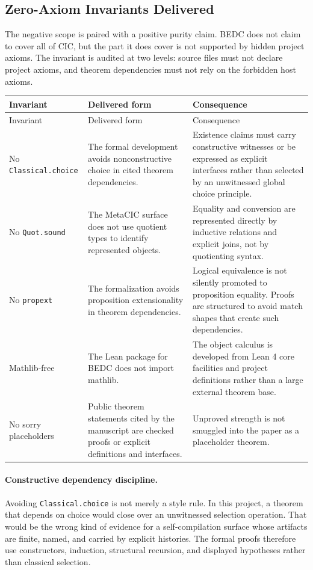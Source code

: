 \subsection{Zero-Axiom Invariants Delivered}
\label{subsec:metacic-zero-axiom-invariants}

The negative scope is paired with a positive purity claim.  BEDC does not
claim to cover all of CIC, but the part it does cover is not supported by
hidden project axioms.  The invariant is audited at two levels: source files
must not declare project axioms, and theorem dependencies must not rely on
the forbidden host axioms.

\begin{longtable}{p{}p{}p{}}
\toprule
Invariant & Delivered form & Consequence \\
\midrule
\endfirsthead
\toprule
Invariant & Delivered form & Consequence \\
\midrule
\endhead
No \texttt{Classical.choice} &
The formal development avoids nonconstructive choice in cited theorem
dependencies. &
Existence claims must carry constructive witnesses or be expressed as explicit
interfaces rather than selected by an unwitnessed global choice principle. \\
No \texttt{Quot.sound} &
The MetaCIC surface does not use quotient types to identify represented
objects. &
Equality and conversion are represented directly by inductive relations and
explicit joins, not by quotienting syntax. \\
No \texttt{propext} &
The formalization avoids proposition extensionality in theorem dependencies. &
Logical equivalence is not silently promoted to proposition equality.  Proofs
are structured to avoid match shapes that create such dependencies. \\
Mathlib-free &
The Lean package for BEDC does not import mathlib. &
The object calculus is developed from Lean 4 core facilities and project
definitions rather than a large external theorem base. \\
No sorry placeholders &
Public theorem statements cited by the manuscript are checked proofs or
explicit definitions and interfaces. &
Unproved strength is not smuggled into the paper as a placeholder theorem. \\
\bottomrule
\end{longtable}

\paragraph{Constructive dependency discipline.}
Avoiding \texttt{Classical.choice} is not merely a style rule.  In this
project, a theorem that depends on choice would close over an unwitnessed
selection operation.  That would be the wrong kind of evidence for a
self-compilation surface whose artifacts are finite, named, and carried by
explicit histories.  The formal proofs therefore use constructors,
induction, structural recursion, and displayed hypotheses rather than
classical selection.

